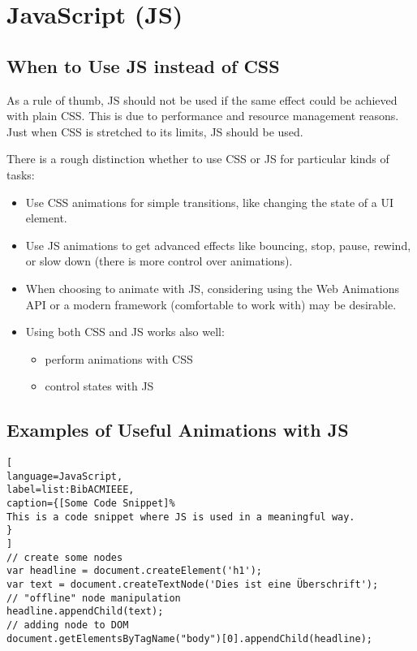 %
%
% 
% 
% 


\chapter{JavaScript (JS)}

\label{chap:JS}

\section{When to Use JS instead of CSS}

As a rule of thumb, JS should not be used if the same effect could be achieved with plain CSS. This is due to performance and resource management reasons. Just when CSS is stretched to its limits, JS should be used.

There is a rough distinction whether to use CSS or JS for particular kinds of tasks:
\begin{itemize}
	\item Use CSS animations for simple transitions, like changing the state of a UI element.
	\item Use JS animations to get advanced effects like bouncing, stop, pause, rewind, or slow down (there is more control over animations).
	\item When choosing to animate with JS, considering using the Web Animations API or a modern framework (comfortable to work with) may be desirable.
	\item Using both CSS and JS works also well:
	\begin{itemize}
		\item perform animations with CSS
		\item control states with JS
	\end{itemize}
\end{itemize}


\section{Examples of Useful Animations with JS}



\begin{lstlisting}[
language=JavaScript,
label=list:BibACMIEEE,
caption={[Some Code Snippet]%
This is a code snippet where JS is used in a meaningful way.
}
]
// create some nodes
var headline = document.createElement('h1');
var text = document.createTextNode('Dies ist eine Überschrift');
// "offline" node manipulation
headline.appendChild(text);
// adding node to DOM
document.getElementsByTagName("body")[0].appendChild(headline);
\end{lstlisting}